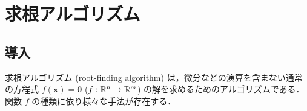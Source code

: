 %

\part{求根アルゴリズム}

\chapter{導入}

求根アルゴリズム (root-finding algorithm)
は，微分などの演算を含まない通常の方程式
$f(\bm{x})=\bm{0}$ ($f : \mathbb{R}^n \to \mathbb{R}^m$)
の解を求めるためのアルゴリズムである．
関数 $f$ の種類に依り様々な手法が存在する．


